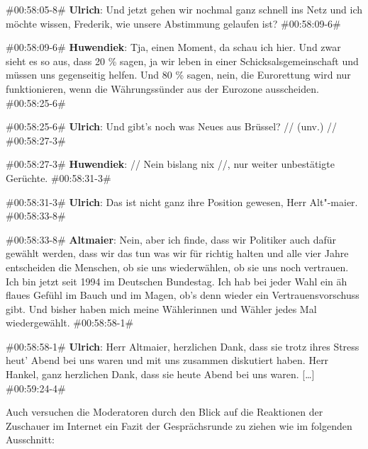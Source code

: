 \begin{description}
	\begin{linenumbers}[1]
		\item \#00:58:05-8\# \textbf{Ulrich}: Und jetzt gehen wir nochmal ganz schnell ins Netz und ich möchte wissen, Frederik, wie unsere Abstimmung gelaufen ist? \#00:58:09-6\#
		
		\item \#00:58:09-6\# \textbf{Huwendiek}: Tja, einen Moment, da schau ich hier. Und zwar sieht es so aus, dass 20 \% sagen, ja wir leben in einer Schicksalsgemeinschaft und müssen uns gegenseitig helfen. Und 80 \% sagen, nein, die Eurorettung wird nur funktionieren, wenn die Währungssünder aus der Eurozone ausscheiden. \#00:58:25-6\#
		
		\item \#00:58:25-6\# \textbf{Ulrich}: Und gibt's noch was Neues aus Brüssel? // (unv.) // \#00:58:27-3\#
		
		\item \#00:58:27-3\# \textbf{Huwendiek}: // Nein bislang nix //, nur weiter unbestätigte Gerüchte. \#00:58:31-3\#
		
		\item \#00:58:31-3\# \textbf{Ulrich}: Das ist nicht ganz ihre Position gewesen, Herr Alt"-maier. \#00:58:33-8\#
		
		\item \#00:58:33-8\# \textbf{Altmaier}: Nein, aber ich finde, dass wir Politiker auch dafür gewählt werden, dass wir das tun was wir für richtig halten und alle vier Jahre entscheiden die Menschen, ob sie uns wiederwählen, ob sie uns noch vertrauen. Ich bin jetzt seit 1994 im Deutschen Bundestag. Ich hab bei jeder Wahl ein äh flaues Gefühl im Bauch und im Magen, ob's denn wieder ein Vertrauensvorschuss gibt. Und bisher haben mich meine Wählerinnen und Wähler jedes Mal wiedergewählt. \#00:58:58-1\#
		
		\item \#00:58:58-1\# \textbf{Ulrich}: Herr Altmaier, herzlichen Dank, dass sie trotz ihres Stress heut' Abend bei uns waren und mit uns zusammen diskutiert haben. Herr Hankel, ganz herzlichen Dank, dass sie heute Abend bei uns waren. [\ldots] \#00:59:24-4\# 
	\end{linenumbers}
	\label{lis:7}
\end{description}

Auch versuchen die Moderatoren durch den Blick auf die Reaktionen der Zuschauer im Internet ein Fazit der Gesprächsrunde zu ziehen wie im folgenden Ausschnitt:

